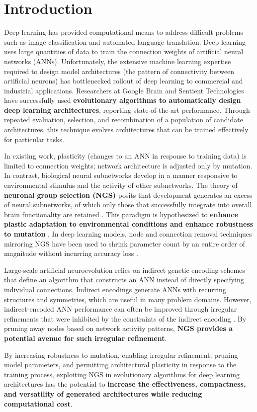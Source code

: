 \section{Introduction}

Deep learning has provided computational means to address difficult problems such as image classification and automated language translation.
Deep learning uses large quantities of data to train the connection weights of artificial neural networks (ANNs).
Unfortunately, the extensive machine learning expertise required to design model architectures (the pattern of connectivity between artificial neurons) has bottlenecked rollout of deep learning to commercial and industrial applications. Researchers at Google Brain \cite{real2017large} and Sentient Technologies \cite{miikkulainen2017evolving} have successfully used \textbf{evolutionary algorithms to automatically design deep learning architectures}, reporting state-of-the-art performance.
Through repeated evaluation, selection, and recombination of a population of candidate architectures, this technique evolves architectures that can be trained effectively for particular tasks.

In existing work, plasticity (changes to an ANN in response to training data) is limited to connection weights;
network architecture is adjusted only by mutation.
In contrast, biological neural subnetworks develop in a manner responsive to environmental stimulus and the activity of other subnetworks.
The theory of \textbf{neuronal group selection (NGS)} posits that development generates an excess of neural subnetworks, of which only those that successfully integrate into overall brain functionality are retained \cite{sanes2011development}.
This paradigm is hypothesized to \textbf{enhance plastic adaptation to environmental conditions and enhance robustness to mutation} \cite{downing2015intelligence}.
In deep learning models, node and connection removal techniques mirroring NGS have been used to shrink parameter count by an entire order of magnitude without incurring accuracy loss \cite{song2015learning}.

Large-scale artificial neuroevolution relies on indirect genetic encoding schemes that define an algorithm that constructs an ANN instead of directly specifying individual connections.
Indirect encodings generate ANNs with recurring structures and symmetries, which are useful in many problem domains.
However, indirect-encoded ANN performance can often be improved through irregular refinements that were inhibited by the constraints of the indirect encoding \cite{clune2011performance}.
By pruning away nodes based on network activity patterns, \textbf{NGS provides a potential avenue for such irregular refinement}.

By increasing robustness to mutation, enabling irregular refinement, pruning model parameters, and permitting architectural plasticity in response to the training process, exploiting NGS in evolutionary algorithms for deep learning architectures has the potential to \textbf{increase the effectiveness, compactness, and versatility of generated architectures while reducing computational cost}.
